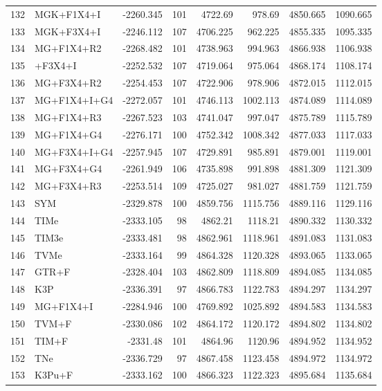 \begin{longtable}{clrrrrrr}
	132 & MGK+F1X4+I & -2260.345 & 101 & 4722.69 & 978.69 & 4850.665 & 1090.665 \\ 
	133 & MGK+F3X4+I & -2246.112 & 107 & 4706.225 & 962.225 & 4855.335 & 1095.335 \\ 
	134 & MG+F1X4+R2 & -2268.482 & 101 & 4738.963 & 994.963 & 4866.938 & 1106.938 \\ 
	135 & \gy+F3X4+I & -2252.532 & 107 & 4719.064 & 975.064 & 4868.174 & 1108.174 \\ 
	136 & MG+F3X4+R2 & -2254.453 & 107 & 4722.906 & 978.906 & 4872.015 & 1112.015 \\ 
	137 & MG+F1X4+I+G4 & -2272.057 & 101 & 4746.113 & 1002.113 & 4874.089 & 1114.089 \\ 
	138 & MG+F1X4+R3 & -2267.523 & 103 & 4741.047 & 997.047 & 4875.789 & 1115.789 \\ 
	139 & MG+F1X4+G4 & -2276.171 & 100 & 4752.342 & 1008.342 & 4877.033 & 1117.033 \\ 
	140 & MG+F3X4+I+G4 & -2257.945 & 107 & 4729.891 & 985.891 & 4879.001 & 1119.001 \\ 
	141 & MG+F3X4+G4 & -2261.949 & 106 & 4735.898 & 991.898 & 4881.309 & 1121.309 \\ 
	142 & MG+F3X4+R3 & -2253.514 & 109 & 4725.027 & 981.027 & 4881.759 & 1121.759 \\ 
	143 & SYM & -2329.878 & 100 & 4859.756 & 1115.756 & 4889.116 & 1129.116 \\ 
	144 & TIMe & -2333.105 & 98 & 4862.21 & 1118.21 & 4890.332 & 1130.332 \\ 
	145 & TIM3e & -2333.481 & 98 & 4862.961 & 1118.961 & 4891.083 & 1131.083 \\ 
	146 & TVMe & -2333.164 & 99 & 4864.328 & 1120.328 & 4893.065 & 1133.065 \\ 
	147 & GTR+F & -2328.404 & 103 & 4862.809 & 1118.809 & 4894.085 & 1134.085 \\ 
	148 & K3P & -2336.391 & 97 & 4866.783 & 1122.783 & 4894.297 & 1134.297 \\ 
	149 & MG+F1X4+I & -2284.946 & 100 & 4769.892 & 1025.892 & 4894.583 & 1134.583 \\ 
	150 & TVM+F & -2330.086 & 102 & 4864.172 & 1120.172 & 4894.802 & 1134.802 \\ 
	151 & TIM+F & -2331.48 & 101 & 4864.96 & 1120.96 & 4894.952 & 1134.952 \\ 
	152 & TNe & -2336.729 & 97 & 4867.458 & 1123.458 & 4894.972 & 1134.972 \\ 
	153 & K3Pu+F & -2333.162 & 100 & 4866.323 & 1122.323 & 4895.684 & 1135.684 \\ 

\end{longtable}
